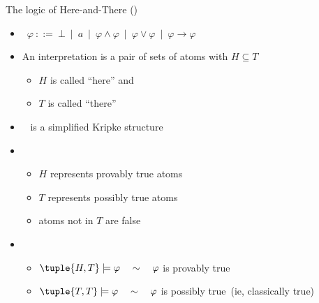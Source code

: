 \begin{frame}{The logic of Here-and-There (\HT)}
  \smallskip
  \begin{itemize}
  \item<2->  \
    \(
    \varphi \ ::= \ \bot \ \mid \ a \ \mid \ \varphi \land \varphi \ \mid \  \varphi \lor \varphi \ \mid \  \varphi \rightarrow \varphi
    \)
    \medskip
  \item<3-> An \alert{interpretation} is a pair  of sets of atoms with $H \subseteq T$
    \begin{itemize}
    \item $H$ is called ``here'' and
    \item $T$ is called ``there''
    \end{itemize}
  \item<4->  \  is a simplified Kripke structure
    \medskip
  \item<5->  \
    \begin{itemize}
    \item $H$ represents provably true atoms
    \item $T$ represents possibly true atoms
    \item \phantom{$T$} atoms not in $T$ are false
    \end{itemize}
    \smallskip
  \item<6-> 
    \begin{itemize}
    \item $\tuple{H,T}\models\varphi\quad \sim\quad \varphi$ is provably true
    \item $\tuple{T,T}\models\varphi\quad \sim\quad \varphi$ is possibly true\pause[6] \ (ie, classically true)
    \end{itemize}
  \end{itemize}
\end{frame}
